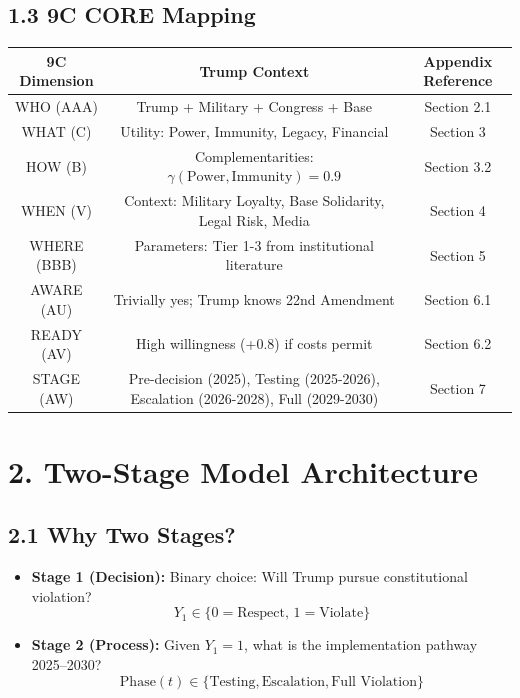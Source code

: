 \documentclass[11pt]{article}
\begin{document}
\subsection{1.3 9C CORE Mapping}

\begin{table}[h]
\centering
\begin{tabular}{|c|c|c|}
\hline
\textbf{9C Dimension} & \textbf{Trump Context} & \textbf{Appendix Reference} \\
\hline
WHO (AAA) & Trump + Military + Congress + Base & Section 2.1 \\
WHAT (C) & Utility: Power, Immunity, Legacy, Financial & Section 3 \\
HOW (B) & Complementarities: $\gamma(\text{Power}, \text{Immunity}) = 0.9$ & Section 3.2 \\
WHEN (V) & Context: Military Loyalty, Base Solidarity, Legal Risk, Media & Section 4 \\
WHERE (BBB) & Parameters: Tier 1-3 from institutional literature & Section 5 \\
AWARE (AU) & Trivially yes; Trump knows 22nd Amendment & Section 6.1 \\
READY (AV) & High willingness (+0.8) if costs permit & Section 6.2 \\
STAGE (AW) & Pre-decision (2025), Testing (2025-2026), Escalation (2026-2028), Full (2029-2030) & Section 7 \\
\hline
\end{tabular}
\end{table}

\section{2. Two-Stage Model Architecture}

\subsection{2.1 Why Two Stages?}

\begin{itemize}
\item \textbf{Stage 1 (Decision):} Binary choice: Will Trump pursue constitutional violation?
  \begin{equation}
  Y_1 \in \{0 = \text{Respect},\, 1 = \text{Violate}\}
  \end{equation}

\item \textbf{Stage 2 (Process):} Given $Y_1 = 1$, what is the implementation pathway 2025--2030?
  \begin{equation}
  \text{Phase}(t) \in \{\text{Testing}, \text{Escalation}, \text{Full Violation}\}
  \end{equation}
\end{itemize}
\end{document}
